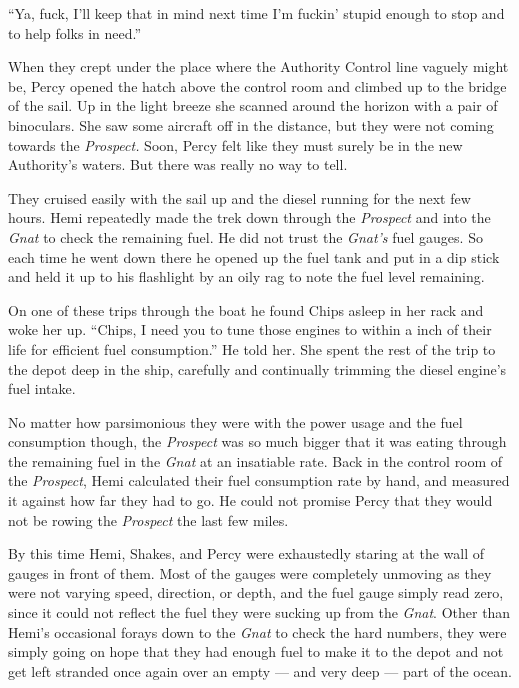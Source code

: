 \documentclass[
]{scrbook}
\begin{document}
``Ya, fuck, I'll keep that in mind next time I'm fuckin' stupid enough
to stop and to help folks in need.''

When they crept under the place where the Authority Control line vaguely
might be, Percy opened the hatch above the control room and climbed up
to the bridge of the sail. Up in the light breeze she scanned around the
horizon with a pair of binoculars. She saw some aircraft off in the
distance, but they were not coming towards the \emph{Prospect.} Soon,
Percy felt like they must surely be in the new Authority's waters. But
there was really no way to tell.

They cruised easily with the sail up and the diesel running for the next
few hours. Hemi repeatedly made the trek down through the
\emph{Prospect} and into the \emph{Gnat} to check the remaining fuel. He
did not trust the \emph{Gnat's} fuel gauges. So each time he went down
there he opened up the fuel tank and put in a dip stick and held it up
to his flashlight by an oily rag to note the fuel level remaining.

On one of these trips through the boat he found Chips asleep in her rack
and woke her up. ``Chips, I need you to tune those engines to within a
inch of their life for efficient fuel consumption.'' He told her. She
spent the rest of the trip to the depot deep in the ship, carefully and
continually trimming the diesel engine's fuel intake.

No matter how parsimonious they were with the power usage and the fuel
consumption though, the \emph{Prospect} was so much bigger that it was
eating through the remaining fuel in the \emph{Gnat} at an insatiable
rate. Back in the control room of the \emph{Prospect}, Hemi calculated
their fuel consumption rate by hand, and measured it against how far
they had to go. He could not promise Percy that they would not be rowing
the \emph{Prospect} the last few miles.

By this time Hemi, Shakes, and Percy were exhaustedly staring at the
wall of gauges in front of them. Most of the gauges were completely
unmoving as they were not varying speed, direction, or depth, and the
fuel gauge simply read zero, since it could not reflect the fuel they
were sucking up from the \emph{Gnat}. Other than Hemi's occasional
forays down to the \emph{Gnat} to check the hard numbers, they were
simply going on hope that they had enough fuel to make it to the depot
and not get left stranded once again over an empty --- and very deep ---
part of the ocean.
\end{document}
